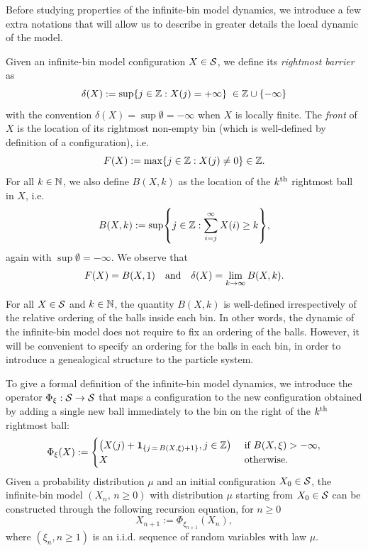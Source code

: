 \documentclass[AHL,Unicode,longabstracts,published]{cedram}
\newcommand{\bbN}{\mathbb{N}}
\newcommand{\Z}{\mathbb{Z}}
\newcommand{\ind}[1]{\mathbf{1}_{\left\{#1\right\}}}
\renewcommand{\S}{\mathcal{S}}
\let\originalleft\left
\let\originalright\right
\renewcommand{\left}{\mathopen{}\mathclose\bgroup\originalleft}
\renewcommand{\right}{\aftergroup\egroup\originalright}
\let\oldin\in
\renewcommand{\in}{\mathchoice{\oldin}{\oldin}{\,\oldin\,}{\,\oldin\,}}
\renewcommand*{\to}{\mathchoice{\longrightarrow}{\rightarrow}{\rightarrow}{\rightarrow}}
\newcommand{\Z}{\mathbb{Z}}
\begin{document}
Before studying properties of the infinite-bin model dynamics, we introduce a few extra notations that will allow us to describe in greater details the local dynamic of the model.

Given an infinite-bin model configuration $X \in \S$, we define its \emph{rightmost barrier} as
\begin{equation}\label{def:deltabarrier}
\delta(X)
:= \sup\{j\in \Z : X(j) = +\infty\} \;\in \Z\cup\{-\infty\}
\end{equation}
with the convention $\delta(X) = \sup \emptyset = -\infty$ when $X$ is locally finite. The \emph{front} of $X$ is the location of its rightmost non-empty bin (which is well-defined by definition of a configuration), i.e.
\[
F(X)
:= \max\{ j \in \Z : X(j) \neq 0\} \in \Z.
\]
For all $k \in \bbN$, we also define $B(X,k)$ as the location of the $k^{\rm th}$ rightmost ball in $X$, i.e.
\[
B(X,k)
:= \sup\left\{ j \in \Z : \sum_{i=j}^\infty X(i) \geq k \right\},
\]
again with $\sup \emptyset = -\infty$. We observe that
\[
F(X) = B(X,1)\quad\text{and}\quad\delta(X) = \lim_{k\to\infty} B(X,k).
\]

\begin{rema}
For all $X \in \S$ and $k \in \bbN$, the quantity $B(X, k)$ is well-defined irrespectively of the relative ordering of the balls inside each bin. In other words, the dynamic of the infinite-bin model does not require to fix an ordering of the balls. However, it will be convenient to specify an ordering for the balls in each bin, in order to introduce a genealogical structure to the particle system.
\end{rema}


To give a formal definition of the infinite-bin model dynamics, we introduce the operator $\Phi_\xi : \S \to \S$ that maps a configuration to the new configuration obtained by adding a single new ball immediately to the bin on the right of the $k^{\rm th}$ rightmost ball:
\begin{equation}\label{eq:operatorPhi}
\Phi_\xi(X)
:=
\begin{cases}
\left(X(j) + \ind{j\,=\,B(X,\xi)+1}, j \in \Z\right) & \text{ if } B(X,\xi) > -\infty,\\
X & \text{ otherwise.}
\end{cases}
\end{equation}
Given a probability distribution $\mu$ and an initial configuration $X_0 \in \S$, the infinite-bin model $(X_n,\, n\geq 0)$ with distribution $\mu$ starting from $X_0 \in \S$ can be constructed through the following recursion equation, for $n\geq 0$
\begin{equation}\label{eqn:ibm}
X_{n+1}
:= \Phi_{\xi_{n+1}} (X_n),
\end{equation}
where $(\xi_n, n \geq 1)$ is an i.i.d. sequence of random variables with law $\mu$.
\end{document}
